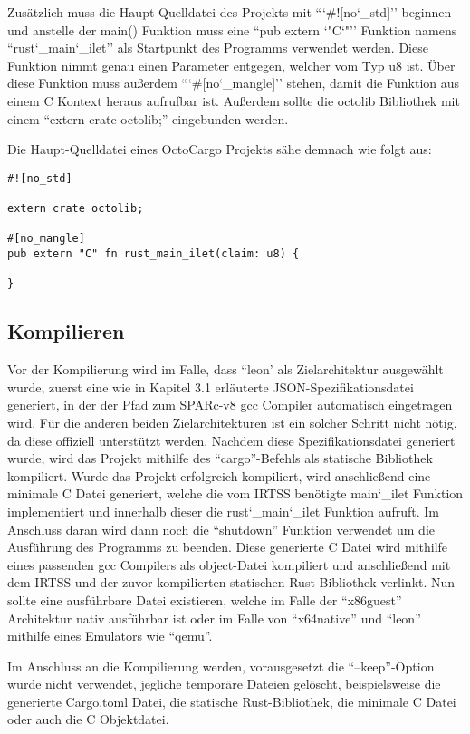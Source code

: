 Zusätzlich muss die Haupt-Quelldatei des Projekts mit ``\char`#![no\char`_std]'' beginnen und anstelle der main()
Funktion muss eine ``pub extern \char`"C\char`"'' Funktion namens ``rust\char`_main\char`_ilet'' als Startpunkt des Programms
verwendet werden.
Diese Funktion nimmt genau einen Parameter entgegen, welcher vom Typ u8 ist.
Über diese  Funktion muss außerdem ``\char`#[no\char`_mangle]'' stehen, damit die Funktion aus einem C Kontext heraus
aufrufbar ist.
Außerdem sollte die octolib Bibliothek mit einem ``extern crate octolib;'' eingebunden werden.


Die Haupt-Quelldatei eines OctoCargo Projekts sähe demnach wie folgt aus:
\begin{verbatim}
#![no_std]

extern crate octolib;

#[no_mangle]
pub extern "C" fn rust_main_ilet(claim: u8) {

}
\end{verbatim}

\subsection{Kompilieren}

Vor der Kompilierung wird im Falle, dass ``leon' als Zielarchitektur ausgewählt wurde, zuerst eine wie in Kapitel 3.1 erläuterte
JSON-Spezifikationsdatei generiert, in der der Pfad zum SPARc-v8 gcc Compiler automatisch eingetragen wird. Für die anderen beiden
Zielarchitekturen ist ein solcher Schritt nicht nötig, da diese offiziell unterstützt werden. 
Nachdem diese Spezifikationsdatei generiert wurde, wird das Projekt mithilfe des ``cargo''-Befehls als statische Bibliothek 
kompiliert. Wurde das Projekt erfolgreich kompiliert, wird anschließend eine minimale C Datei generiert,
welche die vom IRTSS benötigte main\char`_ilet Funktion implementiert und innerhalb
dieser die rust\char`_main\char`_ilet Funktion aufruft. Im Anschluss daran wird dann noch die ``shutdown'' Funktion verwendet um die 
Ausführung des Programms zu beenden. Diese generierte C Datei wird mithilfe eines passenden gcc Compilers als object-Datei kompiliert
und anschließend mit dem IRTSS und der zuvor kompilierten statischen Rust-Bibliothek verlinkt. Nun sollte eine ausführbare Datei
existieren, welche im Falle der ``x86guest'' Architektur nativ ausführbar ist oder im Falle von ``x64native'' und ``leon''
mithilfe eines Emulators wie ``qemu''.

Im Anschluss an die Kompilierung werden, vorausgesetzt die ``--keep''-Option wurde nicht verwendet, jegliche temporäre Dateien
gelöscht, beispielsweise die generierte Cargo.toml Datei, die statische Rust-Bibliothek, die minimale C Datei oder auch die C
Objektdatei.

